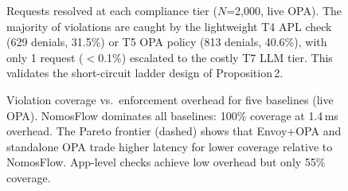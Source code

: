 
\begin{figure}[t]
\centering

\caption{%
  Requests resolved at each compliance tier ($N$=2{,}000, live OPA).
  The majority of violations are caught by the lightweight T4 APL
  check (629 denials, 31.5\%) or T5 OPA policy (813 denials, 40.6\%),
  with only 1 request ($<$0.1\%) escalated to the costly T7 LLM tier.
  This validates the short-circuit ladder design of Proposition\,2.
}
\label{fig:tier-histogram}
\end{figure}

\begin{figure}[t]
\centering

\caption{%
  Violation coverage vs.\ enforcement overhead for five baselines (live OPA).
  NomosFlow dominates all baselines: 100\% coverage at 1.4\,ms overhead.
  The Pareto frontier (dashed) shows that Envoy+OPA and standalone
  OPA trade higher latency for lower coverage relative to NomosFlow.
  App-level checks achieve low overhead but only 55\% coverage.
}
\label{fig:coverage-frontier}
\end{figure}
